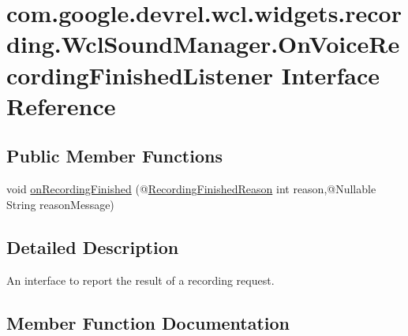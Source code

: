 \hypertarget{interfacecom_1_1google_1_1devrel_1_1wcl_1_1widgets_1_1recording_1_1WclSoundManager_1_1OnVoiceRecordingFinishedListener}{}\section{com.\+google.\+devrel.\+wcl.\+widgets.\+recording.\+Wcl\+Sound\+Manager.\+On\+Voice\+Recording\+Finished\+Listener Interface Reference}
\label{interfacecom_1_1google_1_1devrel_1_1wcl_1_1widgets_1_1recording_1_1WclSoundManager_1_1OnVoiceRecordingFinishedListener}
\subsection*{Public Member Functions}
\begin{DoxyCompactItemize}
\item 
void \hyperlink{interfacecom_1_1google_1_1devrel_1_1wcl_1_1widgets_1_1recording_1_1WclSoundManager_1_1OnVoiceRecordingFinishedListener_abe140ae0ccfa406b6541f5e6f4634f7d}{on\+Recording\+Finished} (@\hyperlink{interfacecom_1_1google_1_1devrel_1_1wcl_1_1widgets_1_1recording_1_1WclSoundManager_1_1RecordingFinishedReason}{Recording\+Finished\+Reason} int reason,@Nullable String reason\+Message)
\end{DoxyCompactItemize}


\subsection{Detailed Description}
An interface to report the result of a recording request. 

\subsection{Member Function Documentation}
